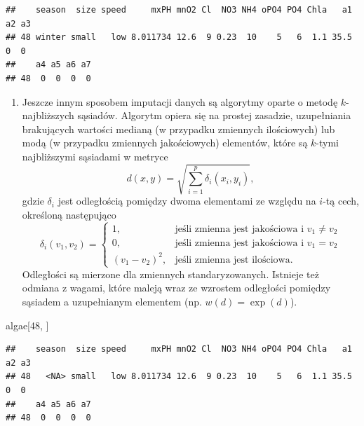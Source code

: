 \documentclass[]{book}
\newenvironment{Shaded}{\begin{snugshade}}{\end{snugshade}}
\newcommand{\DecValTok}[1]{\textcolor[rgb]{0.00,0.00,0.81}{#1}}
\newcommand{\NormalTok}[1]{#1}
\providecommand{\tightlist}{%
  \setlength{\itemsep}{0pt}\setlength{\parskip}{0pt}}
\theoremstyle{plain}
\theoremstyle{definition}
\theoremstyle{definition}
\theoremstyle{definition}
\theoremstyle{definition}
\theoremstyle{remark}
\begin{document}
\begin{verbatim}
##    season  size speed     mxPH mnO2 Cl  NO3 NH4 oPO4 PO4 Chla   a1 a2 a3
## 48 winter small   low 8.011734 12.6  9 0.23  10    5   6  1.1 35.5  0  0
##    a4 a5 a6 a7
## 48  0  0  0  0
\end{verbatim}

\begin{enumerate}
\def\labelenumi{\arabic{enumi}.}
\setcounter{enumi}{3}
\tightlist
\item
  Jeszcze innym sposobem imputacji danych są algorytmy oparte o metodę \(k\)-najbliższych sąsiadów. Algorytm opiera się na prostej zasadzie, uzupełniania brakujących wartości medianą (w przypadku zmiennych ilościowych) lub modą (w przypadku zmiennych jakościowych) elementów, które są \(k\)-tymi najbliższymi sąsiadami w metryce
  \begin{equation}\label{knn}
   d(x,y)=\sqrt{\sum_{i=1}^{p}\delta_i(x_i,y_i)},
  \end{equation}
  gdzie \(\delta_i\) jest odległością pomiędzy dwoma elementami ze względu na \(i\)-tą cech, określoną następująco
  \begin{equation}\label{metryka}
   \delta_i(v_1, v_2)=\begin{cases}
       1,& \text{jeśli zmienna jest jakościowa i }v_1\neq v_2\\
       0,& \text{jeśli zmienna jest jakościowa i }v_1=v_2\\
       (v_1-v_2)^2,& \text{jeśli zmienna jest ilościowa.}
   \end{cases}
  \end{equation}
  Odległości są mierzone dla zmiennych standaryzowanych. Istnieje też odmiana z wagami, które maleją wraz ze wzrostem odległości pomiędzy sąsiadem a uzupełnianym elementem (np. \(w(d)=\exp(d)\)).
\end{enumerate}

\begin{Shaded}
\begin{Highlighting}[]
\NormalTok{algae[}\DecValTok{48}\NormalTok{, ]}
\end{Highlighting}
\end{Shaded}

\begin{verbatim}
##    season  size speed     mxPH mnO2 Cl  NO3 NH4 oPO4 PO4 Chla   a1 a2 a3
## 48   <NA> small   low 8.011734 12.6  9 0.23  10    5   6  1.1 35.5  0  0
##    a4 a5 a6 a7
## 48  0  0  0  0
\end{verbatim}
\end{document}
